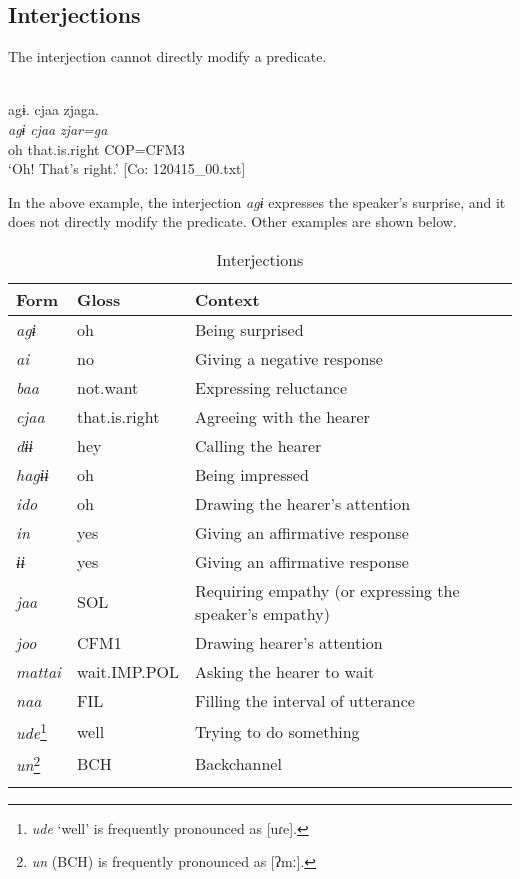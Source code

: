 \subsection{Interjections}\label{sec:4.3.7}

The interjection cannot directly modify a predicate.

\ea{}\label{ex:4.56}\\
\glll    agɨ.  cjaa  zjaga.  \\
    \textit{agɨ}  \textit{cjaa}  \textit{zjar=ga}  \\
    oh  that.is.right  COP=CFM3  \\
  \glt     ‘Oh! That’s right.’ [Co: 120415\_00.txt]
\z

In the above example, the interjection \textit{agɨ} expresses the speaker’s surprise, and it does not directly modify the predicate. Other examples are shown below.

\begin{table}
\caption{\label{tab:29}Interjections}
\begin{tabular}{lll}
\lsptoprule
Form & Gloss & Context\\\midrule
\textit{agɨ}   & oh              & Being surprised\\
\textit{ai}    & no              & Giving a negative response\\
\textit{baa}   & not.want        & Expressing reluctance\\
\textit{cjaa}  &  that.is.right  & Agreeing with the hearer\\
\textit{dɨɨ}   & hey             & Calling the hearer\\
\textit{hagɨɨ} & oh            & Being impressed\\
\textit{ido}   & oh              & Drawing the hearer’s attention\\
\textit{in}    & yes              & Giving an affirmative response\\
\textit{ɨɨ}    & yes              & Giving an affirmative response\\
\textit{jaa}   & SOL             & Requiring empathy (or expressing the speaker’s empathy)\\
\textit{joo}   & CFM1            & Drawing hearer’s attention\\
\textit{mattai} &  wait.IMP.POL & Asking the hearer to wait\\
\textit{naa}   & FIL             & Filling the interval of utterance\\
\textit{ude}\footnote{\textit{ude} ‘well’ is frequently pronounced as [uɾe].} & well & Trying to do something\\
\textit{un}\footnote{\textit{un} (BCH) is frequently pronounced as [ʔmː].}    & BCH   &Backchannel\\
\lspbottomrule
\end{tabular}
\end{table}

